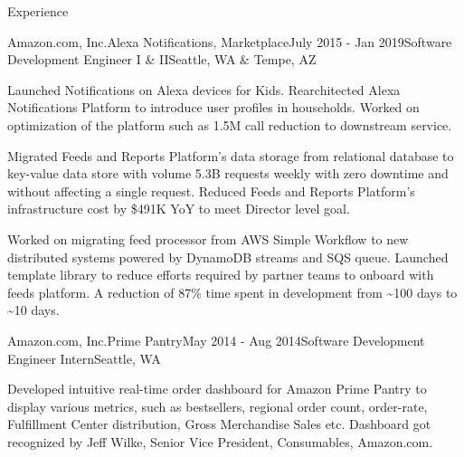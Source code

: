 \documentclass{resume} %
\begin{document}
\begin{rSection}{Experience}
	\begin{rSubsection}{Amazon.com, Inc.}{Alexa Notifications, Marketplace}{July 2015 - Jan 2019}{Software Development Engineer I \& II}{Seattle, WA \& Tempe, AZ}
        \item Launched Notifications on Alexa devices for Kids. Rearchitected Alexa Notifications Platform to introduce user profiles in households. Worked on optimization of the platform such as 1.5M call reduction to downstream service.
        \item Migrated Feeds and Reports Platform's data storage from relational database to key-value data store with volume 5.3B requests weekly with zero downtime and without affecting a single request. Reduced Feeds and Reports Platform's infrastructure cost by \$491K YoY to meet Director level goal.
        \item Worked on migrating feed processor from AWS Simple Workflow to new distributed systems powered by DynamoDB streams and SQS queue. Launched template library to reduce efforts required by partner teams to onboard with feeds platform. A reduction of 87\% time spent in development from \~{}100 days to \~{}10 days.
	\end{rSubsection}
	
	\begin{rSubsection}{Amazon.com, Inc.}{Prime Pantry}{May 2014 - Aug 2014}{Software Development Engineer Intern}{Seattle, WA}
        \item Developed intuitive real-time order dashboard for Amazon Prime Pantry to display various metrics, such as bestsellers, regional order count, order-rate, Fulfillment Center distribution, Gross Merchandise Sales etc. Dashboard got recognized by Jeff Wilke, Senior Vice President, Consumables, Amazon.com.
	\end{rSubsection}
	
\end{rSection}

\end{document}
